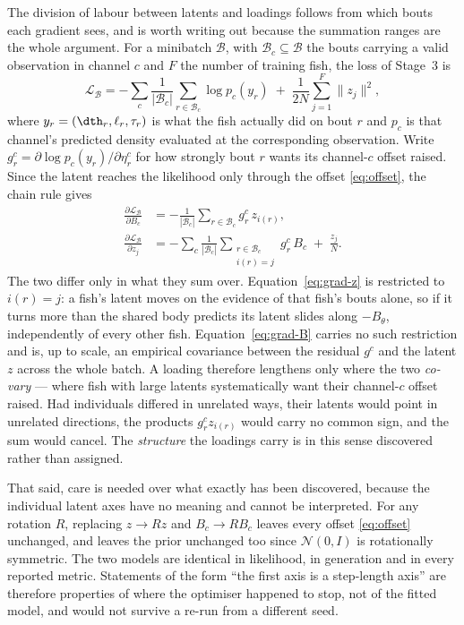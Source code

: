 The division of labour between latents and loadings follows from which bouts
each gradient sees, and is worth writing out because the summation ranges are
the whole argument. For a minibatch $\mathcal{B}$, with
$\mathcal{B}_c\subseteq\mathcal{B}$ the bouts carrying a valid observation in
channel $c$ and $F$ the number of training fish, the loss of Stage~3 is
\begin{equation}
\mathcal{L}_{\mathcal{B}}
= -\sum_{c}\frac{1}{|\mathcal{B}_c|}\sum_{r\in\mathcal{B}_c}\log p_c(y_r)
\;+\;\frac{1}{2N}\sum_{j=1}^{F}\lVert z_j\rVert^{2},
\end{equation}
where $y_r=(\dth_r,\ell_r,\tau_r)$ is what the fish actually did on bout $r$ and
$p_c$ is that channel's predicted density evaluated at the corresponding
observation. Write
$g^{c}_{r}=\partial\log p_c(y_r)/\partial\eta^{c}_{r}$ for how strongly
bout $r$ wants its channel-$c$ offset raised. Since the latent reaches the
likelihood only through the offset \eqref{eq:offset}, the chain rule gives
\begin{align}
\frac{\partial\mathcal{L}_{\mathcal{B}}}{\partial B_c}
&= -\frac{1}{|\mathcal{B}_c|}\sum_{r\in\mathcal{B}_c} g^{c}_{r}\,z_{i(r)},
\label{eq:grad-B}\\[4pt]
\frac{\partial\mathcal{L}_{\mathcal{B}}}{\partial z_j}
&= -\sum_{c}\frac{1}{|\mathcal{B}_c|}
   \sum_{\substack{r\in\mathcal{B}_c\\ i(r)=j}} g^{c}_{r}\,B_c
\;+\;\frac{z_j}{N}.
\label{eq:grad-z}
\end{align}
The two differ only in what they sum over. Equation~\eqref{eq:grad-z} is
restricted to $i(r)=j$: a fish's latent moves on the evidence of that fish's
bouts alone, so if it turns more than the shared body predicts its latent slides
along $-B_\theta$, independently of every other fish. Equation~\eqref{eq:grad-B}
carries no such restriction and is, up to scale, an empirical covariance between
the residual $g^c$ and the latent $z$ across the whole batch. A loading
therefore lengthens only where the two \emph{co-vary} --- where fish with large
latents systematically want their channel-$c$ offset raised. Had individuals
differed in unrelated ways, their latents would point in unrelated directions,
the products $g^{c}_{r}z_{i(r)}$ would carry no common sign, and the sum would
cancel. The \emph{structure} the loadings carry is in this sense discovered
rather than assigned.

That said, care is needed over what exactly has been discovered, because the
individual latent axes have no meaning and cannot be interpreted. For any
rotation $R$, replacing $z\to Rz$ and $B_c\to RB_c$ leaves every offset
\eqref{eq:offset} unchanged, and leaves the prior unchanged too since
$\mathcal{N}(0,I)$ is rotationally symmetric. The two models are identical in
likelihood, in generation and in every reported metric. Statements of the form
``the first axis is a step-length axis'' are therefore properties of where the
optimiser happened to stop, not of the fitted model, and would not survive a
re-run from a different seed.

